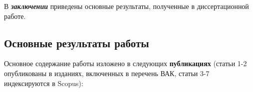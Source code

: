 В \textbf{\textit{заключении}} приведены основные результаты, полученные в диссертационной работе.
\subsection*{Основные результаты работы}




\renewcommand*{\refname}{\vspace*{-13mm}}

\renewcommand{\refname}{\large Публикации автора по теме диссертации}
Основное содержание работы изложено в следующих \textbf{публикациях} (статьи 1-2 опубликованы в изданиях, включенных в перечень ВАК, статьи 3-7 индексируются в Scopus):
\nocite{*}
\insertbiblioauthor                          %
